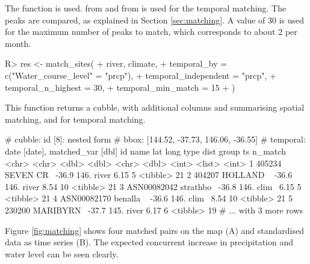 \documentclass[
]{jss}
\begin{document}
The  function is used.  from  and  from  is used for the temporal matching. The peaks are compared, as explained in Section \ref{sec:matching}. A value of 30 is used for the maximum number of peaks to match, which corresponds to about 2 per month.

\begin{CodeChunk}
\begin{CodeInput}
R> res <- match_sites(
+   river, climate,
+   temporal_by = c("Water_course_level" = "prcp"),
+   temporal_independent = "prcp",  
+   temporal_n_highest = 30,
+   temporal_min_match = 15
+ )
\end{CodeInput}
\end{CodeChunk}

This function returns a cubble, with additional columns  and  summarising spatial matching, and  for temporal matching.

\begin{CodeChunk}
\begin{CodeOutput}
# cubble:   id [8]: nested form
# bbox:     [144.52, -37.73, 146.06, -36.55]
# temporal: date [date], matched_var [dbl]
  id          name        lat  long type   dist group ts       n_match
  <chr>       <chr>     <dbl> <dbl> <chr> <dbl> <int> <list>     <int>
1 405234      SEVEN CR~ -36.9  146. river  6.15     5 <tibble>      21
2 404207      HOLLAND ~ -36.6  146. river  8.54    10 <tibble>      21
3 ASN00082042 strathbo~ -36.8  146. clim~  6.15     5 <tibble>      21
4 ASN00082170 benalla ~ -36.6  146. clim~  8.54    10 <tibble>      21
5 230200      MARIBYRN~ -37.7  145. river  6.17     6 <tibble>      19
# ... with 3 more rows
\end{CodeOutput}
\end{CodeChunk}

Figure \ref{fig:matching} shows four matched pairs on the map (A) and standardised data as time series (B). The expected concurrent increase in precipitation and water level can be seen clearly.
\end{document}
